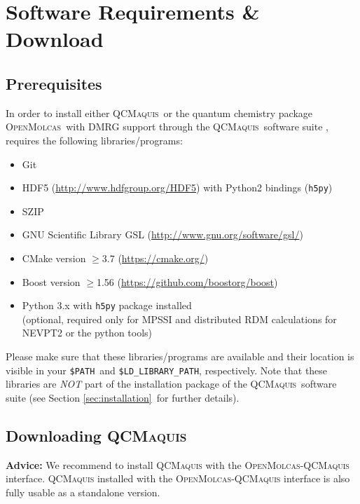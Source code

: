 \documentclass[bibliography=totoc,12pt,a4paper]{scrartcl}
\newcommand{\mol}{\textsc{OpenMolcas}}
\newcommand{\qcm}{\textsc{QCMaquis}}
\begin{document}
\section{Software Requirements \& Download}\label{sec:install-req}

\subsection{Prerequisites}
In order to install either \qcm\ or the quantum chemistry package \mol\ with DMRG support through the \qcm\ software suite \cite{Keller_JChemPhys_efficient_2015,interface}, requires the following libraries/programs:

\begin{itemize}
 \item Git
 \item HDF5 (\url{http://www.hdfgroup.org/HDF5}) with Python2 bindings (\texttt{h5py})
 \item SZIP
 \item GNU Scientific Library GSL (\url{http://www.gnu.org/software/gsl/})
 \item CMake version $\geq$3.7 (\url{https://cmake.org/})
 \item Boost version $\geq$1.56 (\url{https://github.com/boostorg/boost})
 \item Python 3.x with \texttt{h5py} package installed\\
(optional, required only for MPSSI and distributed RDM calculations for NEVPT2 or the python tools)
\end{itemize}
\vspace{0.01cm}
\noindent
Please make sure that these libraries/programs are available and their location is visible in your \texttt{\$PATH}\ and
\texttt{\$LD\_LIBRARY\_PATH}, respectively.
Note that these libraries are \emph{NOT} part of the installation package of the \qcm\ software suite (see Section \ref{sec:installation}\
for further details).


\subsection{Downloading \qcm{}}\label{sec:reg}

\begin{framed}
\noindent \textbf{Advice:} We recommend to install \qcm{} with the \mol-\qcm{} interface. \qcm{} installed with the \mol-\qcm{} interface is also fully usable as a standalone version.
\end{framed}
\end{document}
